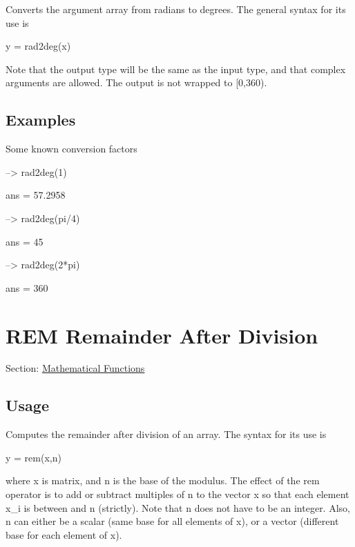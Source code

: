 Converts the argument array from radians to degrees. The general syntax for its use is \begin{DoxyVerb}   y = rad2deg(x)
\end{DoxyVerb}
 Note that the output type will be the same as the input type, and that complex arguments are allowed. The output is not wrapped to {\ttfamily \mbox{[}0,360)}. \hypertarget{variables_matrix_Examples}{}\subsection{Examples}\label{variables_matrix_Examples}
Some known conversion factors


\begin{DoxyVerbInclude}
--> rad2deg(1) %

ans = 
   57.2958 

--> rad2deg(pi/4) %

ans = 
 45 

--> rad2deg(2*pi) %

ans = 
 360 
\end{DoxyVerbInclude}
 \hypertarget{mathfunctions_rem}{}\section{R\-E\-M Remainder After Division}\label{mathfunctions_rem}
Section\-: \hyperlink{sec_mathfunctions}{Mathematical Functions} \hypertarget{vtkwidgets_vtkxyplotwidget_Usage}{}\subsection{Usage}\label{vtkwidgets_vtkxyplotwidget_Usage}
Computes the remainder after division of an array. The syntax for its use is \begin{DoxyVerb}   y = rem(x,n)
\end{DoxyVerb}
 where {\ttfamily x} is matrix, and {\ttfamily n} is the base of the modulus. The effect of the {\ttfamily rem} operator is to add or subtract multiples of {\ttfamily n} to the vector {\ttfamily x} so that each element {\ttfamily x\-\_\-i} is between {} and {\ttfamily n} (strictly). Note that {\ttfamily n} does not have to be an integer. Also, {\ttfamily n} can either be a scalar (same base for all elements of {\ttfamily x}), or a vector (different base for each element of {\ttfamily x}).

